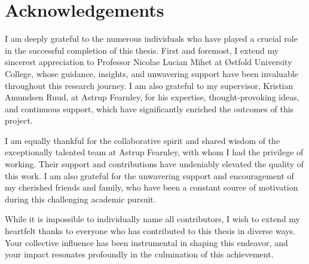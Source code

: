 \chapter*{Acknowledgements}

I am deeply grateful to the numerous individuals who have played a crucial role in the successful completion of this thesis. First and foremost, I extend my sincerest appreciation to Professor Nicolae Lucian Mihet at Østfold University College, whose guidance, insights, and unwavering support have been invaluable throughout this research journey. I am also grateful to my supervisor, Kristian Amundsen Ruud, at Astrup Fearnley, for his expertise, thought-provoking ideas, and continuous support, which have significantly enriched the outcomes of this project.

I am equally thankful for the collaborative spirit and shared wisdom of the exceptionally talented team at Astrup Fearnley, with whom I had the privilege of working. Their support and contributions have undeniably elevated the quality of this work. I am also grateful for the unwavering support and encouragement of my cherished friends and family, who have been a constant source of motivation during this challenging academic pursuit.

While it is impossible to individually name all contributors, I wish to extend my heartfelt thanks to everyone who has contributed to this thesis in diverse ways. Your collective influence has been instrumental in shaping this endeavor, and your impact resonates profoundly in the culmination of this achievement.
